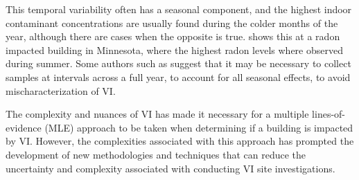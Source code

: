This temporal variability often has a seasonal component, and the highest indoor contaminant concentrations are usually found during the colder months of the year\cite{schumacher_fluctuation_2012,holton_temporal_2013}, although there are cases when the opposite is true. %
\citeauthor{steck_indoor_2004}\cite{steck_indoor_2004} shows this at a radon impacted building in Minnesota, where the highest radon levels where observed during summer.
Some authors such as \citeauthor{bekele_influence_2014}\cite{bekele_influence_2014} suggest that it may be necessary to collect samples at intervals across a full year, to account for all seasonal effects, to avoid mischaracterization of VI.\par

The complexity and nuances of VI has made it necessary for a multiple lines-of-evidence (MLE) approach to be taken when determining if a building is impacted by VI\cite{u.s._environmental_protection_agency_oswer_2015,pennell_field_2016}.
However, the complexities associated with this approach has prompted the development of new methodologies and techniques that can reduce the uncertainty and complexity associated with conducting VI site investigations.
